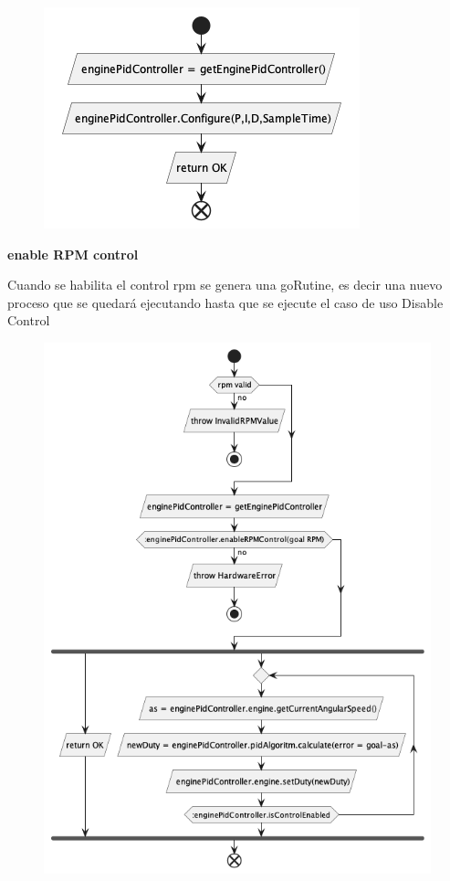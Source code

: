 \begin{figure}[H]
    \centering
    \includegraphics[height=0.2\textheight]{./part/Proyecto_ejecutivo/memoria_descriptiva/descripcionDelProyecto/control/uml/configurePID}
    \caption[Diagrama de objetos de dominio]{}\label{fig:configurePID}
\end{figure}

\textbf{enable RPM control}

Cuando se habilita el control rpm se genera una goRutine, es decir una nuevo proceso que se quedará ejecutando hasta que se ejecute el caso de uso Disable Control

\begin{figure}[H]
    \centering
    \includegraphics[height=0.4\textheight]{./part/Proyecto_ejecutivo/memoria_descriptiva/descripcionDelProyecto/control/uml/enableRPMControl}
    \caption[Diagrama de objetos de dominio]{}\label{fig:enableRMPControl}
\end{figure}

